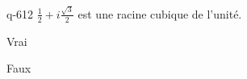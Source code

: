 \begin{truefalse}{q-612}
$\frac{1}{2}+i\frac{\sqrt 3}{2}$ est une racine cubique de l'unité.
\item Vrai
\item* Faux
\end{truefalse}

